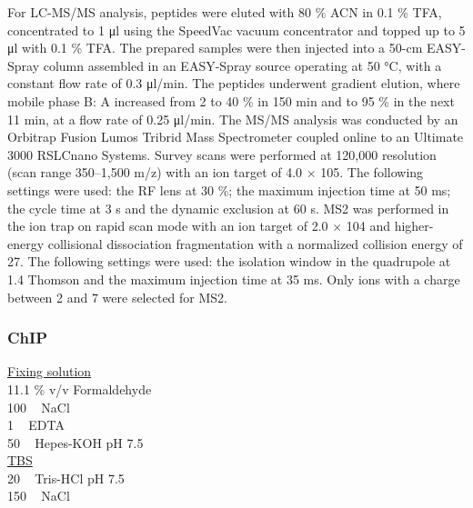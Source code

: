 For LC-MS/MS analysis, peptides were eluted with 80 \% ACN in 0.1 \% TFA, concentrated to 1 \si{\micro\litre} using the SpeedVac vacuum concentrator and topped up to 5 \si{\micro\litre} with 0.1 \% TFA. The prepared samples were then injected into a 50-\si{\centi\metre} EASY-Spray column assembled in an EASY-Spray source operating at 50 \si{\celsius}, with a constant flow rate of 0.3 \si{\micro\litre/\minute}. The peptides underwent gradient elution, where mobile phase B: A increased from 2 to 40 \% in 150 \si{\minute} and to 95 \% in the next 11 \si{\minute}, at a flow rate of 0.25 \si{\micro\litre/\minute}. The MS/MS analysis was conducted by an Orbitrap Fusion Lumos Tribrid Mass Spectrometer coupled online to an Ultimate 3000 RSLCnano Systems. Survey scans were performed at 120,000 resolution (scan range 350–1,500 m/z) with an ion target of 4.0 × 105. The following settings were used: the RF lens at 30 \%; the maximum injection time at 50 \si{\milli\second}; the cycle time at 3 \si{\second} and the dynamic exclusion at 60 \si{\second}. MS2 was performed in the ion trap on rapid scan mode with an ion target of 2.0 × 104 and higher-energy collisional dissociation fragmentation with a normalized collision energy of 27. The following settings were used: the isolation window in the quadrupole at 1.4 Thomson and the maximum injection time at 35 \si{\milli\second}. Only ions with a charge between 2 and 7 were selected for MS2. 



\subsubsection{ChIP}

\underline{Fixing solution}\\
11.1 \% v/v Formaldehyde \\
100 \si{\milli\Molar} NaCl\\
1 \si{\milli\Molar} EDTA\\
50 \si{\milli\Molar} Hepes-KOH pH 7.5\\

\underline{TBS}\\
20 \si{\milli\Molar} Tris-HCl pH 7.5\\
150 \si{\milli\Molar} NaCl\\

